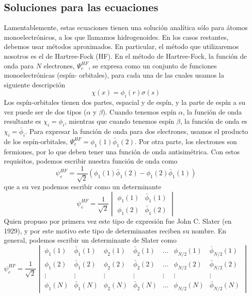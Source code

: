 \documentclass{tufte-book}
\begin{document}
\subsection{Soluciones para las ecuaciones}
Lamentablemente, estas ecuaciones tienen una solución analítica
sólo para átomos monoelectrónicos, a los que llamamos 
hidrogenoides. En los casos restantes, debemos usar métodos
aproximados. En particular, el método que utilizaremos nosotros
es el de Hartree-Fock (HF). En el método de Hartree-Fock, 
la función de onda para $N$ electrones, $\Psi^{HF}_e$, se
expresa como un conjunto de funciones monoelectrónicas (espín-
orbitales), para cada una de las cuales usamos la siguiente
descripción
\begin{equation}
    \chi(x)=\phi_i(r)\sigma(s)
\end{equation}
Los espín-orbitales tienen dos partes, espacial y de espín, y
la parte de espín a su vez puede ser de dos tipos ($\alpha$
y $\beta$). Cuando tenemos espín $\alpha$, la función de onda
resultante es $\chi_i=\phi_i$, mientras que cuando tenemos
espín $\beta$, la función de onda es $\chi_i=\bar{\phi}_i$.
Para expresar la función de onda para dos electrones, usamos
el producto de los espín-orbitales, 
$\Psi_e^{HF}=\phi_1(1)\bar{\phi}_1(2)$.
Por otra parte, los electrones son fermiones, por lo que
deben tener una función de onda antisimétrica. Con estos 
requisitos, podemos escribir nuestra función de onda como
\begin{equation}
    \psi_e^{HF}=\frac{1}{\sqrt{2}}(\phi_1(1)\bar{\phi}_1(2)-\phi_1(2)\bar{\phi}_1(1))
\end{equation}
que a su vez podemos escribir como un determinante
\begin{equation}
    \psi_e^{HF}=\frac{1}{\sqrt{2}} 
    \begin{vmatrix}
    \phi_1(1) & \bar{\phi}_1(1)\\ 
    \phi_1(2) & \bar{\phi}_1(2)
    \end{vmatrix}
\end{equation}
Quien propuso por primera vez este tipo de expresión fue
John C. Slater (en 1929), y por este motivo este tipo
de determinantes reciben su nombre. En general, podemos
escribir un determinante de Slater como
\begin{equation}
    \psi_e^{HF}=\frac{1}{\sqrt{2}} 
    \begin{vmatrix}
    \phi_1(1) & \bar{\phi}_1(1) & \phi_2(1) & \bar{\phi}_2(1)& ...& \phi_{N/2}(1) & \bar{\phi}_{N/2}(1)\\ 
    \phi_1(2) & \bar{\phi}_1(2) & \phi_2(2) & \bar{\phi}_2(2)& ...& \phi_{N/2}(2) & \bar{\phi}_{N/2}(2) \\
    \vdots & \vdots &\vdots &\vdots &\vdots &\vdots &\vdots \\
    \phi_1(N) & \bar{\phi}_1(N) & \phi_2(N) & \bar{\phi}_2(N)& ...& \phi_{N/2}(N) & \bar{\phi}_{N/2}(N)
    \end{vmatrix}
\end{equation}
\end{document}
